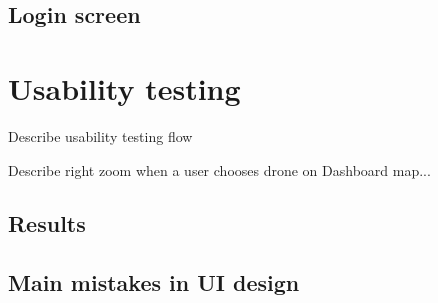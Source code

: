 \subsection{Login screen}\label{subsec:login-screen}

\section{Usability testing}\label{sec:usability-testing}
Describe usability testing flow

Describe right zoom when a user chooses drone on Dashboard map...

\subsection{Results}\label{subsec:results}

\subsection{Main mistakes in UI design}\label{subsec:main-mistakes-in-ui-design}